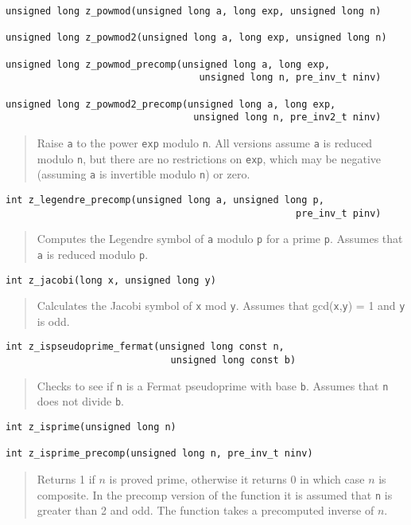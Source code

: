 \documentclass[a4paper,10pt]{article}
\newcommand{\code}{\lstinline}
\begin{document}
\begin{lstlisting}
unsigned long z_powmod(unsigned long a, long exp, unsigned long n)

unsigned long z_powmod2(unsigned long a, long exp, unsigned long n)

unsigned long z_powmod_precomp(unsigned long a, long exp, 
                                  unsigned long n, pre_inv_t ninv)
                                     
unsigned long z_powmod2_precomp(unsigned long a, long exp, 
                                 unsigned long n, pre_inv2_t ninv)
\end{lstlisting}
\begin{quote}
Raise \code{a} to the power \code{exp} modulo \code{n}. All versions assume \code{a} is reduced modulo \code{n}, but there are no restrictions on \code{exp}, which may be negative (assuming \code{a} is invertible modulo \code{n}) or zero. 
\end{quote}                              

\begin{lstlisting}
int z_legendre_precomp(unsigned long a, unsigned long p, 
                                                   pre_inv_t pinv)
\end{lstlisting}
\begin{quote}
Computes the Legendre symbol of \code{a} modulo \code{p} for a prime \code{p}. Assumes that \code{a} is reduced modulo \code{p}.
\end{quote}

\begin{lstlisting}
int z_jacobi(long x, unsigned long y)
\end{lstlisting}
\begin{quote}
Calculates the Jacobi symbol of \code{x} mod \code{y}. Assumes that gcd(\code{x},\code{y}) = 1 and \code{y} is odd.  
\end{quote}

\begin{lstlisting}
int z_ispseudoprime_fermat(unsigned long const n,
                             unsigned long const b)
\end{lstlisting}
\begin{quote}
Checks to see if \code{n} is a Fermat pseudoprime with base \code{b}.  Assumes that \code{n} does not divide \code{b}. 
\end{quote}

\begin{lstlisting}
int z_isprime(unsigned long n)

int z_isprime_precomp(unsigned long n, pre_inv_t ninv)
\end{lstlisting}
\begin{quote}
Returns 1 if $n$ is proved prime, otherwise it returns 0 in which case $n$ is composite. In the precomp version of the function it is assumed that \code{n} is greater than 2 and odd. The function takes a precomputed inverse of $n$.
\end{quote}
\end{document}
